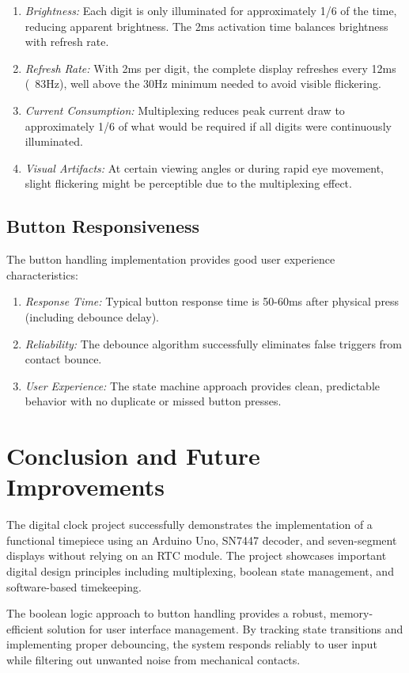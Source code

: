 \documentclass{article}
\begin{document}
\begin{enumerate}
\item \textit{Brightness:} Each digit is only illuminated for approximately 1/6 of the time, reducing apparent brightness. The 2ms activation time balances brightness with refresh rate.
\item \textit{Refresh Rate:} With 2ms per digit, the complete display refreshes every 12ms (~83Hz), well above the 30Hz minimum needed to avoid visible flickering.
\item \textit{Current Consumption:} Multiplexing reduces peak current draw to approximately 1/6 of what would be required if all digits were continuously illuminated.
\item \textit{Visual Artifacts:} At certain viewing angles or during rapid eye movement, slight flickering might be perceptible due to the multiplexing effect.
\end{enumerate}

\subsection{Button Responsiveness}
The button handling implementation provides good user experience characteristics:

\begin{enumerate}
\item \textit{Response Time:} Typical button response time is 50-60ms after physical press (including debounce delay).
\item \textit{Reliability:} The debounce algorithm successfully eliminates false triggers from contact bounce.
\item \textit{User Experience:} The state machine approach provides clean, predictable behavior with no duplicate or missed button presses.
\end{enumerate}

\section{Conclusion and Future Improvements}
The digital clock project successfully demonstrates the implementation of a functional timepiece using an Arduino Uno, SN7447 decoder, and seven-segment displays without relying on an RTC module. The project showcases important digital design principles including multiplexing, boolean state management, and software-based timekeeping.

The boolean logic approach to button handling provides a robust, memory-efficient solution for user interface management. By tracking state transitions and implementing proper debouncing, the system responds reliably to user input while filtering out unwanted noise from mechanical contacts.
\end{document}

